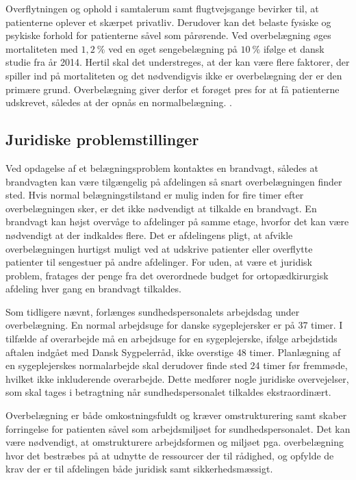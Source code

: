 \noindet
Overflytningen og ophold i samtalerum samt flugtvejsgange bevirker til, at patienterne oplever et skærpet privatliv. \cite{Madsen2014} Derudover kan det belaste fysiske og psykiske forhold for patienterne såvel som pårørende. \cite{Heidmann2014} Ved overbelægning øges mortaliteten med $1,2~\%$ ved en øget sengebelægning på $10~\%$ ifølge et dansk studie fra år 2014. \cite{Madsen2014} Hertil skal det understreges, at der kan være flere faktorer, der spiller ind på mortaliteten og det nødvendigvis ikke er overbelægning der er den primære grund. Overbelægning giver derfor et forøget pres for at få patienterne udskrevet, således at der opnås en normalbelægning. .


\subsection{Juridiske problemstillinger}
Ved opdagelse af et belægningsproblem kontaktes en brandvagt, således at brandvagten kan være tilgængelig på afdelingen så snart overbelægningen finder sted. Hvis normal belægningstilstand er mulig inden for fire timer efter overbelægningen sker, er det ikke nødvendigt at tilkalde en brandvagt. En brandvagt kan højst overvåge to afdelinger på samme etage, hvorfor det kan være nødvendigt at der indkaldes flere. Det er afdelingens pligt, at  afvikle overbelægningen hurtigst muligt ved at udskrive patienter eller overflytte patienter til sengestuer på andre afdelinger. \cite{Beredskab2016} For uden, at være et juridisk problem, fratages der penge fra det overordnede budget for ortopædkirurgisk afdeling hver gang en brandvagt tilkaldes.  

\noindent
Som tidligere nævnt, forlænges sundhedspersonalets arbejdsdag under overbelægning. En normal arbejdsuge for danske sygeplejersker er på 37 timer. I tilfælde af overarbejde må en arbejdsuge for en sygeplejerske, ifølge arbejdstids aftalen indgået med Dansk Sygpelerråd, ikke overstige 48 timer. Planlægning af en sygeplejerskes normalarbejde skal derudover finde sted 24 timer før fremmøde, hvilket ikke inkluderende overarbejde. \cite{Danske2015}  Dette medfører nogle juridiske overvejelser, som skal tages i betragtning når sundhedspersonalet tilkaldes ekstraordinært. 

\noindent
{}
Overbelægning er både omkostningsfuldt og kræver omstrukturering samt skaber forringelse for patienten såvel som arbejdsmiljøet for sundhedspersonalet. Det kan være nødvendigt, at omstrukturere arbejdsformen og miljøet pga.  overbelægning hvor det bestræbes på at udnytte de ressourcer der til rådighed, og opfylde de krav der er til afdelingen både juridisk samt sikkerhedsmæssigt. 
